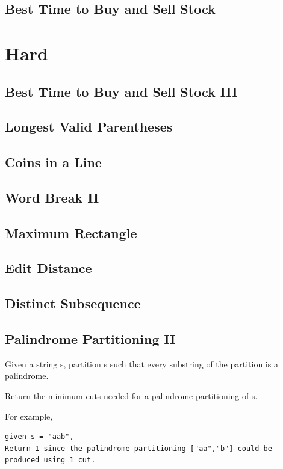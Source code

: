 \documentclass[11pt]{book}
\begin{document}
\subsection{Best Time to Buy and Sell Stock}
\label{sec-14-2-11}
\section{Hard}
\label{sec-14-3}
\subsection{Best Time to Buy and Sell Stock III}
\label{sec-14-3-1}
\subsection{Longest Valid Parentheses}
\label{sec-14-3-2}

\subsection{Coins in a Line}
\label{sec-14-3-3}
\subsection{Word Break II}
\label{sec-14-3-4}
\subsection{Maximum Rectangle}
\label{sec-14-3-5}
\subsection{Edit Distance}
\label{sec-14-3-6}
\subsection{Distinct Subsequence}
\label{sec-14-3-7}
\subsection{Palindrome Partitioning II}
\label{sec-14-3-8}
Given a string s, partition s such that every substring of the partition is a palindrome.

Return the minimum cuts needed for a palindrome partitioning of s.

For example, 
\lstset{language=java,label= ,caption= ,numbers=none}
\begin{lstlisting}
given s = "aab",
Return 1 since the palindrome partitioning ["aa","b"] could be produced using 1 cut.
\end{lstlisting}
\end{document}
